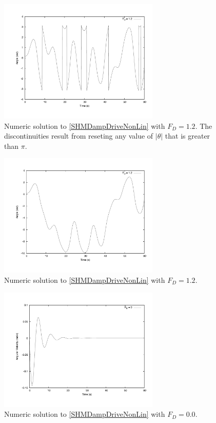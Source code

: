 \documentclass[12pt]{article}
\begin{document}
\begin{figure}[!h]
\centering
\includegraphics[width =110 mm, height = 59mm]{Fig_3_6_12_res.pdf}
\caption{Numeric solution to \eqref{SHMDampDriveNonLin} with $F_D=1.2$.  The discontinuities result from reseting any value of $|\theta|$ that is greater than $\pi$.}
\label{fig:3_6_12}
\end{figure}
\begin{figure}[!h]
\centering
\includegraphics[width =110 mm, height = 59mm]{Fig_3_6_12_nores.pdf}
\caption{Numeric solution to \eqref{SHMDampDriveNonLin} with $F_D=1.2$.}
\label{fig:3_6_12_nores}
\end{figure}
\begin{figure}[!h]
\centering
\includegraphics[width =110 mm, height = 59mm]{Fig_3_6_0_omeg.pdf}
\caption{Numeric solution to \eqref{SHMDampDriveNonLin} with $F_D=0.0$.}
\label{fig:3_6_0_omeg}
\end{figure}
\end{document}
